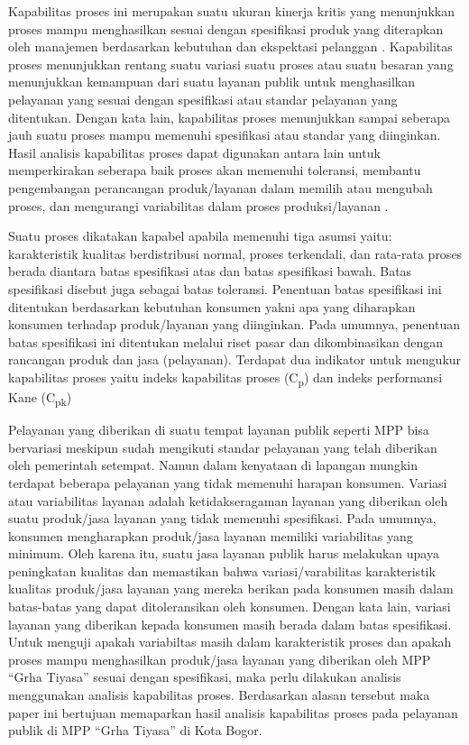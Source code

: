 Kapabilitas proses ini merupakan suatu ukuran kinerja kritis yang menunjukkan proses mampu menghasilkan sesuai dengan spesifikasi produk yang diterapkan oleh manajemen berdasarkan kebutuhan dan ekspektasi pelanggan \cite{gasperz2004production}. Kapabilitas proses menunjukkan rentang suatu variasi suatu proses atau suatu besaran yang menunjukkan kemampuan dari suatu layanan publik untuk menghasilkan pelayanan yang sesuai dengan spesifikasi atau standar pelayanan yang ditentukan. Dengan kata lain, kapabilitas proses menunjukkan sampai seberapa jauh suatu proses mampu memenuhi spesifikasi atau standar yang diinginkan. Hasil analisis kapabilitas proses dapat digunakan antara lain untuk memperkirakan seberapa baik proses akan memenuhi toleransi, membantu pengembangan perancangan produk/layanan dalam memilih atau mengubah proses, dan mengurangi variabilitas dalam proses produksi/layanan \cite{harjosoedarmo1996}.

Suatu proses dikatakan kapabel apabila memenuhi tiga asumsi yaitu: karakteristik kualitas berdistribusi normal, proses terkendali, dan rata-rata proses berada diantara batas spesifikasi atas dan batas spesifikasi bawah. Batas spesifikasi disebut juga sebagai batas toleransi. Penentuan batas spesifikasi ini ditentukan berdasarkan kebutuhan konsumen yakni apa yang diharapkan konsumen terhadap produk/layanan yang diinginkan. Pada umumnya, penentuan batas spesifikasi ini ditentukan melalui riset pasar dan dikombinasikan dengan rancangan produk dan jasa (pelayanan). Terdapat dua indikator untuk mengukur kapabilitas proses yaitu indeks kapabilitas proses (C\textsubscript{p}) dan indeks performansi Kane (C\textsubscript{pk})

Pelayanan yang diberikan di suatu tempat layanan publik seperti MPP bisa bervariasi meskipun sudah mengikuti standar pelayanan yang telah diberikan oleh pemerintah setempat. Namun dalam kenyataan di lapangan mungkin terdapat beberapa pelayanan yang tidak memenuhi harapan konsumen. Variasi atau variabilitas layanan adalah ketidakseragaman layanan yang diberikan oleh suatu produk/jasa layanan yang tidak memenuhi spesifikasi. Pada umumnya, konsumen mengharapkan produk/jasa layanan memiliki variabilitas yang minimum. Oleh karena itu, suatu jasa layanan publik harus melakukan upaya peningkatan kualitas dan memastikan bahwa variasi/varabilitas karakteristik kualitas produk/jasa layanan yang mereka berikan pada konsumen masih dalam batas-batas yang dapat ditoleransikan oleh konsumen. Dengan kata lain, variasi layanan yang diberikan kepada konsumen masih berada dalam batas spesifikasi. Untuk menguji apakah variabiltas masih dalam karakteristik proses dan apakah proses mampu menghasilkan produk/jasa layanan yang diberikan oleh MPP ``Grha Tiyasa'' sesuai dengan spesifikasi, maka perlu dilakukan analisis menggunakan analisis kapabilitas proses. Berdasarkan alasan tersebut maka paper ini bertujuan memaparkan hasil analisis kapabilitas proses pada pelayanan publik di MPP ``Grha Tiyasa'' di Kota Bogor.